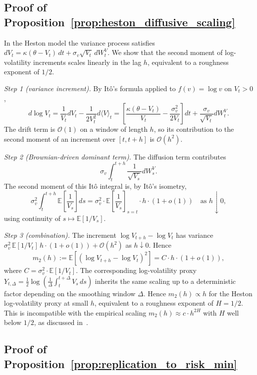 \documentclass[12pt,a4paper]{article}
\theoremstyle{definition}
\theoremstyle{plain}
\theoremstyle{remark}
\theoremstyle{plain}
\begin{document}
\subsection{Proof of Proposition~\ref{prop:heston_diffusive_scaling}}
\label{proof:heston_diffusive}

In the Heston model the variance process satisfies
$dV_t = \kappa(\theta - V_t) \, dt + \sigma_v \sqrt{V_t} \, dW^V_t$.
We show that the second moment of log-volatility increments scales
linearly in the lag $h$, equivalent to a roughness exponent of $1/2$.

\textit{Step 1 (variance increment).} By It\^o's formula applied to
$f(v) = \log v$ on $V_t > 0$,
\[
d \log V_t = \frac{1}{V_t} dV_t - \frac{1}{2 V_t^2} d \langle V \rangle_t
= \left[\frac{\kappa(\theta - V_t)}{V_t} - \frac{\sigma_v^2}{2 V_t}\right] dt
+ \frac{\sigma_v}{\sqrt{V_t}} dW^V_t.
\]
The drift term is $\mathcal{O}(1)$ on a window of length $h$, so its
contribution to the second moment of an increment over $[t, t+h]$ is
$\mathcal{O}(h^2)$.

\textit{Step 2 (Brownian-driven dominant term).} The diffusion term
contributes
\[
\sigma_v \int_t^{t+h} \frac{1}{\sqrt{V_s}} dW^V_s.
\]
The second moment of this Itô integral is, by It\^o's isometry,
\[
\sigma_v^2 \int_t^{t+h} \mathbb{E}\!\left[\frac{1}{V_s}\right] ds
= \sigma_v^2 \cdot \mathbb{E}\!\left[\frac{1}{V_s}\right]_{s = t} \cdot h
\cdot (1 + o(1))
\quad \text{as } h \downarrow 0,
\]
using continuity of $s \mapsto \mathbb{E}[1/V_s]$.

\textit{Step 3 (combination).} The increment $\log V_{t+h} - \log V_t$
has variance $\sigma_v^2 \, \mathbb{E}[1/V_t] \, h \cdot (1 + o(1)) +
\mathcal{O}(h^2)$ as $h \downarrow 0$. Hence
\[
m_2(h) := \mathbb{E}[(\log V_{t+h} - \log V_t)^2]
= C \cdot h \cdot (1 + o(1)),
\]
where $C = \sigma_v^2 \cdot \mathbb{E}[1/V_t]$. The corresponding
log-volatility proxy
$Y_{t,\Delta} = \tfrac12 \log(\tfrac{1}{\Delta} \int_t^{t+\Delta} V_s \,
ds)$ inherits the same scaling up to a deterministic factor depending
on the smoothing window $\Delta$. Hence $m_2(h) \propto h$ for the
Heston log-volatility proxy at small $h$, equivalent to a roughness
exponent of $H = 1/2$. This is incompatible with the empirical scaling
$m_2(h) \approx c \cdot h^{2H}$ with $H$ well below $1/2$, as
discussed in~\cite{GatheralRough}.

\subsection{Proof of Proposition~\ref{prop:replication_to_risk_min}}
\label{proof:capital_requirement}
\end{document}
